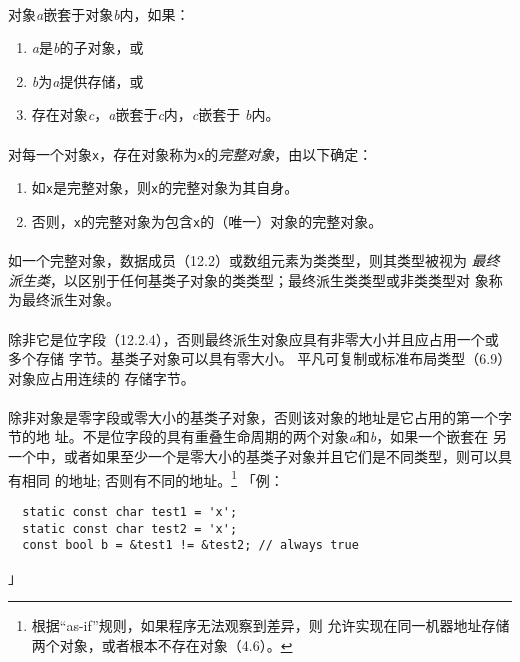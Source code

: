 \paragraph{}
对象\textit{a}嵌套于对象\textit{b}内，如果：
\begin{enumerate}
  \item \textit{a}是\textit{b}的子对象，或
  \item \textit{b}为\textit{a}提供存储，或
  \item 存在对象\textit{c}，\textit{a}嵌套于\textit{c}内，\textit{c}嵌套于
    \textit{b}内。
\end{enumerate}

\paragraph{}
对每一个对象\texttt{x}，存在对象称为\texttt{x}的\textit{完整对象}，由以下确定：
\begin{enumerate}
  \item 如\texttt{x}是完整对象，则\texttt{x}的完整对象为其自身。
  \item 否则，\texttt{x}的完整对象为包含\texttt{x}的（唯一）对象的完整对象。
\end{enumerate}

\paragraph{}
如一个完整对象，数据成员（12.2）或数组元素为类类型，则其类型被视为
\textit{最终派生类}，以区别于任何基类子对象的类类型；最终派生类类型或非类类型对
象称为最终派生对象。

\paragraph{}
除非它是位字段（12.2.4），否则最终派生对象应具有非零大小并且应占用一个或多个存储
字节。基类子对象可以具有零大小。 平凡可复制或标准布局类型（6.9）对象应占用连续的
存储字节。

\paragraph{}
除非对象是零字段或零大小的基类子对象，否则该对象的地址是它占用的第一个字节的地
址。不是位字段的具有重叠生命周期的两个对象\textit{a}和\textit{b}，如果一个嵌套在
另一个中，或者如果至少一个是零大小的基类子对象并且它们是不同类型，则可以具有相同
的地址; 否则有不同的地址。\footnote{根据“as-if”规则，如果程序无法观察到差异，则
允许实现在同一机器地址存储两个对象，或者根本不存在对象（4.6）。}
「例：
\begin{lstlisting}
  static const char test1 = 'x';
  static const char test2 = 'x';
  const bool b = &test1 != &test2; // always true
\end{lstlisting}
」


